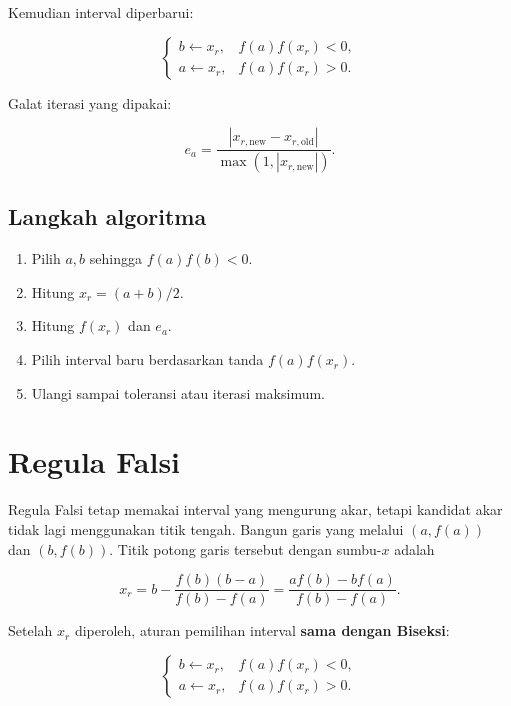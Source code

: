 Kemudian interval diperbarui:

\begin{equation}
\begin{cases}
b\leftarrow x_r, & f(a)f(x_r)<0,\\
a\leftarrow x_r, & f(a)f(x_r)>0.
\end{cases}
\end{equation}

Galat iterasi yang dipakai:

\begin{equation}
e_a=
\frac{|x_{r,\mathrm{new}}-x_{r,\mathrm{old}}|}
{\max(1,|x_{r,\mathrm{new}}|)}.
\end{equation}

\subsection*{Langkah algoritma}

\begin{enumerate}
\item Pilih $a,b$ sehingga $f(a)f(b)<0$.
\item Hitung $x_r=(a+b)/2$.
\item Hitung $f(x_r)$ dan $e_a$.
\item Pilih interval baru berdasarkan tanda $f(a)f(x_r)$.
\item Ulangi sampai toleransi atau iterasi maksimum.
\end{enumerate}

\section{Regula Falsi}

Regula Falsi tetap memakai interval yang mengurung akar, tetapi kandidat akar tidak lagi menggunakan titik tengah.
Bangun garis yang melalui $(a,f(a))$ dan $(b,f(b))$.
Titik potong garis tersebut dengan sumbu-$x$ adalah

\begin{equation}
x_r
=
b-\frac{f(b)(b-a)}{f(b)-f(a)}
=
\frac{a f(b)-b f(a)}{f(b)-f(a)}.
\end{equation}

Setelah $x_r$ diperoleh, aturan pemilihan interval \textbf{sama dengan Biseksi}:

\begin{equation}
\begin{cases}
b\leftarrow x_r, & f(a)f(x_r)<0,\\
a\leftarrow x_r, & f(a)f(x_r)>0.
\end{cases}
\end{equation}

